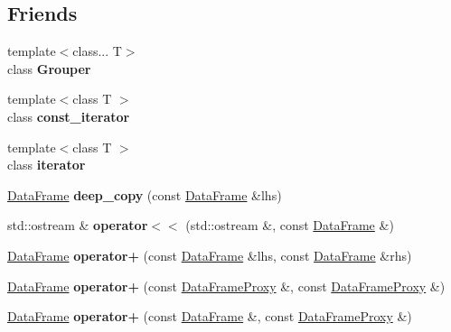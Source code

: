 \subsection*{Friends}
\begin{DoxyCompactItemize}
\item 
\mbox{\label{classDataFrame_a6d45f85447b7949ec8832150ebaf26cc}} 
{\footnotesize template$<$class... T$>$ }\\class {\bfseries Grouper}
\item 
\mbox{\label{classDataFrame_ada44a7c9690829a06c00c22a3ea6fba1}} 
{\footnotesize template$<$class T $>$ }\\class {\bfseries const\+\_\+iterator}
\item 
\mbox{\label{classDataFrame_af4b62491a63a70a7f86bb7425fb5b484}} 
{\footnotesize template$<$class T $>$ }\\class {\bfseries iterator}
\item 
\mbox{\label{classDataFrame_ac665e1df1c1d41e0d0c5afcdfb827a74}} 
\hyperlink{classDataFrame}{Data\+Frame} {\bfseries deep\+\_\+copy} (const \hyperlink{classDataFrame}{Data\+Frame} \&lhs)
\item 
\mbox{\label{classDataFrame_a7372e1909f73624de2939188c8b407bd}} 
std\+::ostream \& {\bfseries operator$<$$<$} (std\+::ostream \&, const \hyperlink{classDataFrame}{Data\+Frame} \&)
\item 
\mbox{\label{classDataFrame_a1b618c630383343b0476d4b2ee3892ba}} 
\hyperlink{classDataFrame}{Data\+Frame} {\bfseries operator+} (const \hyperlink{classDataFrame}{Data\+Frame} \&lhs, const \hyperlink{classDataFrame}{Data\+Frame} \&rhs)
\item 
\mbox{\label{classDataFrame_ac7252ac5b8145feb97ce0b16040cdbde}} 
\hyperlink{classDataFrame}{Data\+Frame} {\bfseries operator+} (const \hyperlink{classDataFrame_1_1DataFrameProxy}{Data\+Frame\+Proxy} \&, const \hyperlink{classDataFrame_1_1DataFrameProxy}{Data\+Frame\+Proxy} \&)
\item 
\mbox{\label{classDataFrame_a32fc0676af70bd35bf83e11c9ab946fc}} 
\hyperlink{classDataFrame}{Data\+Frame} {\bfseries operator+} (const \hyperlink{classDataFrame}{Data\+Frame} \&, const \hyperlink{classDataFrame_1_1DataFrameProxy}{Data\+Frame\+Proxy} \&)

\end{DoxyCompactItemize}

